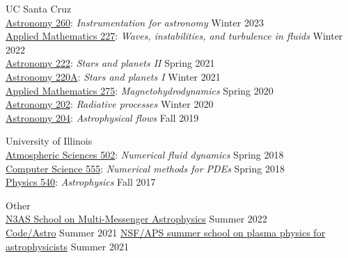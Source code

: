 \documentclass[12pt]{article}
\begin{document}
UC Santa Cruz\\
\href{https://catalog.ucsc.edu/Current/General-Catalog/Courses/ASTR-Astronomy-and-Astrophysics/200/ASTR-260}{Astronomy 260}: \textit{Instrumentation for astronomy} \hfill Winter 2023\\
\href{https://catalog.ucsc.edu/en/Current/General-Catalog/Courses/AM-Applied-Mathematics/Graduate/AM-227}{Applied Mathematics 227}: \textit{Waves, instabilities, and turbulence in fluids} \hfill Winter 2022\\
\href{https://catalog.ucsc.edu/Current/General-Catalog/Courses/ASTR-Astronomy-and-Astrophysics/200/ASTR-222}{Astronomy 222}: \textit{Stars and planets II} \hfill Spring 2021\\
\href{https://catalog.ucsc.edu/Current/General-Catalog/Courses/ASTR-Astronomy-and-Astrophysics/200/ASTR-220A}{Astronomy 220A}: \textit{Stars and planets I} \hfill Winter 2021\\
\href{https://catalog.ucsc.edu/en/Current/General-Catalog/Courses/AM-Applied-Mathematics/Graduate/AM-275}{Applied Mathematics 275}: \textit{Magnetohydrodynamics} \hfill Spring 2020\\
\href{https://catalog.ucsc.edu/en/Current/General-Catalog/Courses/ASTR-Astronomy-and-Astrophysics/200/ASTR-202}{Astronomy 202}: \textit{Radiative processes} \hfill Winter 2020\\
\href{https://catalog.ucsc.edu/en/Current/General-Catalog/Courses/ASTR-Astronomy-and-Astrophysics/200/ASTR-204}{Astronomy 204}: \textit{Astrophysical flows} \hfill Fall 2019

University of Illinois\\
\href{https://courses.illinois.edu/schedule/2018/spring/ATMS/502}{Atmospheric Sciences 502}: \textit{Numerical fluid dynamics} \hfill Spring 2018\\
\href{https://cs.illinois.edu/academics/courses/cs555}{Computer Science 555}: \textit{Numerical methods for PDEs} \hfill Spring 2018\\
\href{https://physics.illinois.edu/academics/courses/profile/PHYS\%20540}{Physics 540}: \textit{Astrophysics} \hfill Fall 2017

Other\\
\href{https://n3as.berkeley.edu/events/summer-school/}{N3AS School on Multi-Messenger Astrophysics} \hfill Summer 2022\\
\href{https://semaphorep.github.io/codeastro/}{Code/Astro} \hfill Summer 2021
\href{https://www.gpapschool.com/}{NSF/APS summer school on plasma physics for astrophysicists} \hfill Summer 2021
\else\fi
\end{document}
